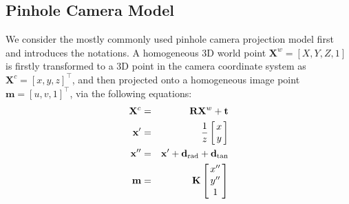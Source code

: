 \documentclass{report}
\begin{document}
\subsection{Pinhole Camera Model}
We consider the mostly commonly used pinhole camera projection model first and introduces the notations. A homogeneous 3D world point $\mathbf{X}^w = [X, Y, Z, 1]$ is firstly transformed to a 3D point in the camera coordinate system as $\mathbf{X}^c = [x, y, z]^\top$, and then projected onto a homogeneous image point $\mathbf{m} = [u, v, 1]^\top$, via the following equations: 
\begin{eqnarray}
\label{cmEqn1}
\mathbf{X}^c &=&
\mathbf{R} \mathbf{X}^w + \mathbf{t} \\
\mathbf{x}' &=& \frac{1}{z} 
\arraycolsep=1.5pt%
\begin{bmatrix}
\begin{array}{c}
x \\ y
\end{array}
\end{bmatrix} \\
\mathbf{x}'' &=& \mathbf{x}' + \mathbf{d}_\text{rad} + \mathbf{d}_\text{tan} \\
\mathbf{m} &=&
\mathbf{K}
\arraycolsep=1.5pt%
\begin{bmatrix}
	\begin{array}{c}
	x'' \\ y'' \\ 1
	\end{array}
\end{bmatrix}
\label{cmEqn4} 
\end{eqnarray}
\end{document}
